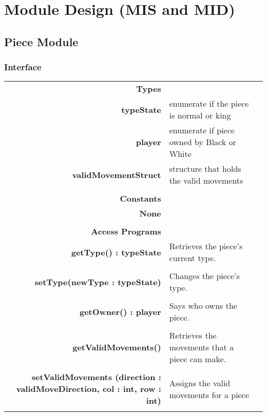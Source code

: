 \documentclass[10pt]{article}
\makeatletter
\newcommand{\CustomLabel}[1]{\Hy@raisedlink{\hypertarget{#1}{}}\label{#1}}
\makeatother
\begin{document}
\section{Module Design (MIS and MID)}


       
    \subsection{Piece Module}\CustomLabel{mis:Piece}
    \subsubsection{Interface}
        \begin{tabularx}{\linewidth}{@{} >{\bfseries}r Xp{5cm} }
            Types           & \begin{tabular}[t]{@{} l p{8cm}} 
                                     & \\
                                    typeState & enumerate if the piece is normal or king \\
                                    player & enumerate if piece owned by Black or White \\
									validMovementStruct & structure that holds the valid movements\\
                              \end{tabular} \\
                              
            Constants       & \begin{tabular}[t]{@{} l p{8cm}} 
                                     & \\
                                    None & \\
                              \end{tabular} \\

            Access Programs & \begin{tabular}[t]{@{} p{4cm} p{8cm}}
                                     & \\
                                    getType() : typeState & Retrieves the piece's current type. \\
                                     & \\
                                    setType(newType : typeState) & Changes the piece's type. \\ 
                                     & \\
                                    getOwner() : player & Says who owns the piece. \\
                                     & \\
									getValidMovements() & Retrieves the movements that a piece can make.\\
                                     & \\
									setValidMovements (direction : validMoveDirection, col : int, row : int) & Assigns the valid movements for a piece\\
                              \end{tabular}
        \end{tabularx}
        
\end{document}
